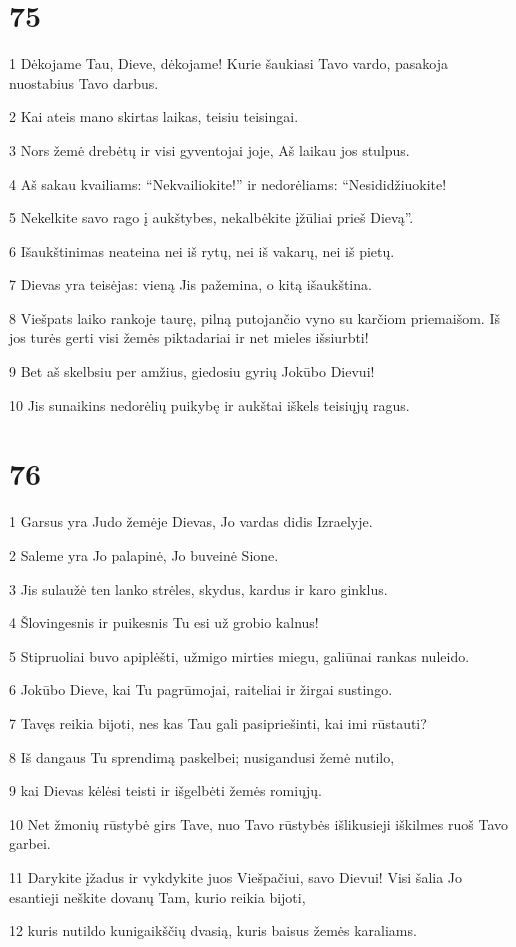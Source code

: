 \chapter{75}


\par 1 Dėkojame Tau, Dieve, dėkojame! Kurie šaukiasi Tavo vardo, pasakoja nuostabius Tavo darbus. 
\par 2 Kai ateis mano skirtas laikas, teisiu teisingai. 
\par 3 Nors žemė drebėtų ir visi gyventojai joje, Aš laikau jos stulpus. 
\par 4 Aš sakau kvailiams: “Nekvailiokite!” ir nedorėliams: “Nesididžiuokite! 
\par 5 Nekelkite savo rago į aukštybes, nekalbėkite įžūliai prieš Dievą”. 
\par 6 Išaukštinimas neateina nei iš rytų, nei iš vakarų, nei iš pietų. 
\par 7 Dievas yra teisėjas: vieną Jis pažemina, o kitą išaukština. 
\par 8 Viešpats laiko rankoje taurę, pilną putojančio vyno su karčiom priemaišom. Iš jos turės gerti visi žemės piktadariai ir net mieles išsiurbti! 
\par 9 Bet aš skelbsiu per amžius, giedosiu gyrių Jokūbo Dievui! 
\par 10 Jis sunaikins nedorėlių puikybę ir aukštai iškels teisiųjų ragus.


\chapter{76}


\par 1 Garsus yra Judo žemėje Dievas, Jo vardas didis Izraelyje. 
\par 2 Saleme yra Jo palapinė, Jo buveinė Sione. 
\par 3 Jis sulaužė ten lanko strėles, skydus, kardus ir karo ginklus. 
\par 4 Šlovingesnis ir puikesnis Tu esi už grobio kalnus! 
\par 5 Stipruoliai buvo apiplėšti, užmigo mirties miegu, galiūnai rankas nuleido. 
\par 6 Jokūbo Dieve, kai Tu pagrūmojai, raiteliai ir žirgai sustingo. 
\par 7 Tavęs reikia bijoti, nes kas Tau gali pasipriešinti, kai imi rūstauti? 
\par 8 Iš dangaus Tu sprendimą paskelbei; nusigandusi žemė nutilo, 
\par 9 kai Dievas kėlėsi teisti ir išgelbėti žemės romiųjų. 
\par 10 Net žmonių rūstybė girs Tave, nuo Tavo rūstybės išlikusieji iškilmes ruoš Tavo garbei. 
\par 11 Darykite įžadus ir vykdykite juos Viešpačiui, savo Dievui! Visi šalia Jo esantieji neškite dovanų Tam, kurio reikia bijoti, 
\par 12 kuris nutildo kunigaikščių dvasią, kuris baisus žemės karaliams.


